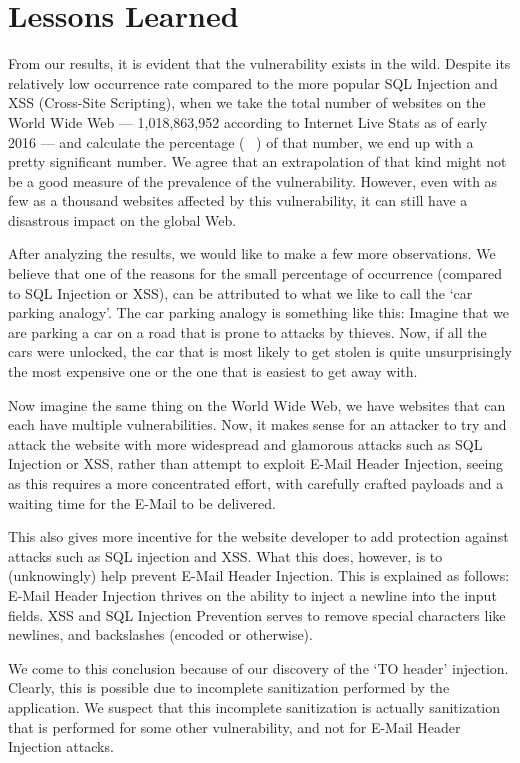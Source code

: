 \section{Lessons Learned}
    From our results, it is evident that the vulnerability exists in the wild. Despite its relatively low occurrence rate compared to the more popular SQL Injection and XSS (Cross-Site Scripting), when we take the total number of websites on the World Wide Web --- 1,018,863,952 according to Internet Live Stats \cite{InternetLiveStats2016} as of early 2016 --- and calculate the percentage ( \successDelta\ ) of that number, we end up with a pretty significant number. We agree that an extrapolation of that kind might not be a good measure of the prevalence of the vulnerability. However, even with as few as a thousand websites affected by this vulnerability, it can still have a disastrous impact on the global Web. 
    
    After analyzing the results, we would like to make a few more observations. We believe that one of the reasons for the small percentage of occurrence (compared to SQL Injection or XSS), can be attributed to what we like to call the `car parking analogy'.
    The car parking analogy is something like this: Imagine that we are parking a car on a road that is prone to attacks by thieves. Now, if all the cars were unlocked, the car that is most likely to get stolen is quite unsurprisingly the most expensive one or the one that is easiest to get away with.
    
    Now imagine the same thing on the World Wide Web, we have websites that can each have multiple vulnerabilities. Now, it makes sense for an attacker to try and attack the website with more widespread and glamorous attacks such as SQL Injection or XSS, rather than attempt to exploit E-Mail Header Injection, seeing as this requires a more concentrated effort, with carefully crafted payloads and a waiting time for the E-Mail to be delivered.
    
    This also gives more incentive for the website developer to add protection against attacks such as SQL injection and XSS. What this does, however, is to (unknowingly) help prevent E-Mail Header Injection. This is explained as follows: E-Mail Header Injection thrives on the ability to inject a newline into the input fields. XSS and SQL Injection Prevention serves to remove special characters like newlines,  and backslashes (encoded or otherwise). 

	We come to this conclusion because of our discovery of the `TO header' injection. Clearly, this is possible due to incomplete sanitization performed by the application. We suspect that this incomplete sanitization is actually sanitization that is performed for some other vulnerability, and not for E-Mail Header Injection attacks.
	
